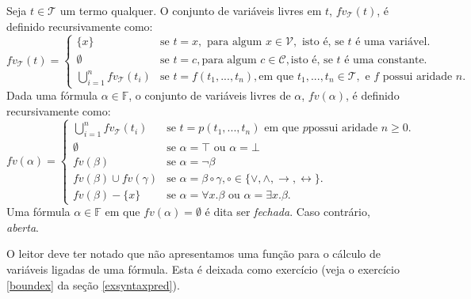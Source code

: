 \begin{Definition}\label{freevars}
Seja $t\in\mathcal{T}$ um termo qualquer. O conjunto de variáveis
livres em $t$, $fv_{\mathcal{T}}(t)$, é definido recursivamente como:
\[
fv_{\mathcal{T}}(t)=\left\{
                             \begin{array}{ll}
                               \{x\} & \text{se }t = x, \text{ para
                                 algum }x \in \mathcal{V},\text{ isto é,
                               se }t\text{ é uma variável}. \\
                               \emptyset & \text{se }t = c, \text{
                                 para algum } c\in\mathcal{C}, \text{
                                 isto é, se }t\text{ é uma constante}.\\
                               \bigcup_{i = 1}^n fv_{\mathcal{T}}(t_i)
                               & \text{se }t = f(t_1,...,t_n), \text{
                                 em que }t_1,...,t_n\in\mathcal{T},
                               \text{ e }f\text{ possui aridade }n.
                             \end{array}
                          \right .
\]
Dada uma fórmula $\alpha\in\mathbb{F}$, o conjunto de variáveis livres
de $\alpha$, $fv(\alpha)$, é definido recursivamente como:
\[
fv(\alpha)=\left\{
                     \begin{array}{ll}
                       \bigcup_{i = 1}^n fv_{\mathcal{T}}(t_i) & \text{se
                       }t = p(t_1,...,t_n) \text{ em que }p \text{
                         possui aridade }n\geq 0.\\
                       \emptyset &  \text{se }\alpha = \top \text{ ou
                       }\alpha = \bot\\
                       fv(\beta) & \text{se }\alpha = \neg \beta\\
                       fv(\beta)\cup fv(\gamma) & \text{se }\alpha =
                       \beta\circ\gamma,
                       \circ\in\{\lor,\land,\to,\leftrightarrow\}.\\
                       fv(\beta) - \{x\} & \text{se }\alpha = \forall
                       x.\beta \text{ ou } \alpha = \exists x.\beta.
                     \end{array}
                  \right .
\]
Uma fórmula $\alpha\in\mathbb{F}$ em que $fv(\alpha) = \emptyset$ é
dita ser \emph{fechada}. Caso contrário, \emph{aberta}.
\end{Definition}
O leitor deve ter notado que não apresentamos uma função para o
cálculo de variáveis ligadas de uma fórmula. Esta é deixada como
exercício (veja o exercício \ref{boundex} da seção \ref{exsyntaxpred}).

